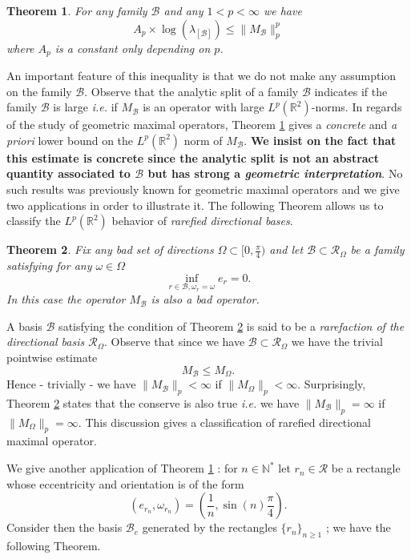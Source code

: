 \documentclass{article}
\newtheorem{thm}{Theorem}
\begin{document}
\begin{thm}\label{ T : main theorem}
For any family $\mathcal{B}$ and any $1 < p < \infty$ we have $$A_p \times \log(\lambda_{[\mathcal{B}]}) \leq \| M_\mathcal{B} \|_p^p$$ where $A_p$ is a constant only depending on $p$.
\end{thm}

An important feature of this inequality is that we do not make any assumption on the family $\mathcal{B}$. Observe that the analytic split of a family $\mathcal{B}$ indicates if the family $\mathcal{B}$ is large \textit{i.e.} if $M_\mathcal{B}$ is an operator with large $L^p(\mathbb{R}^2)$-norms. In regards of the study of geometric maximal operators, Theorem \ref{ T : main theorem} gives a \textit{concrete} and \textit{a priori} lower bound on the $L^p(\mathbb{R}^2)$ norm of $M_\mathcal{B}$. \textbf{We insist on the fact that this estimate is concrete since the analytic split is not an abstract quantity associated to $\mathcal{B}$ but has strong a \textit{geometric interpretation}}. No such results was previously known for geometric maximal operators and we give two applications in order to illustrate it. The following Theorem allows us to classify the $L^p(\mathbb{R}^2)$ behavior of \textit{rarefied directional bases}.

\begin{thm}\label{T:app1}
Fix any bad set of directions $\Omega \subset [0,\frac{\pi}{4})$ and let $\mathcal{B} \subset \mathcal{R}_\Omega$ be a family satisfying for any $\omega \in \Omega$ $$\inf_{ r \in \mathcal{B}, \omega_r = \omega} e_r = 0.$$ In this case the operator $M_\mathcal{B}$ is also a bad operator.
\end{thm}

A basis $\mathcal{B}$ satisfying the condition of Theorem \ref{T:app1} is said to be a \textit{rarefaction of the directional basis $\mathcal{R}_\Omega$}. Observe that since we have $\mathcal{B} \subset \mathcal{R}_\Omega$ we have the trivial pointwise estimate $$M_\mathcal{B} \leq M_\Omega.$$ Hence - trivially - we have $\|M_\mathcal{B}\|_p < \infty$ if $\|M_\Omega\|_p < \infty$. Surprisingly, Theorem \ref{T:app1} states that the conserve is also true \textit{i.e.} we have $\|M_\mathcal{B}\|_p = \infty$ if $\|M_\Omega\|_p = \infty$. This discussion gives a classification of rarefied directional maximal operator.

We give another application of Theorem \ref{ T : main theorem} : for $n \in \mathbb{N}^*$ let $r_n \in \mathcal{R}$ be a rectangle whose eccentricity and orientation is of the form $$\left( e_{r_n}, \omega_{r_n} \right) = \left( \frac{1}{n}, \sin(n)\frac{\pi}{4} \right).$$ Consider then the basis $\mathcal{B}_e$ generated by the rectangles $\{r_n\}_{n \geq 1}$ ; we have the following Theorem.
\end{document}
